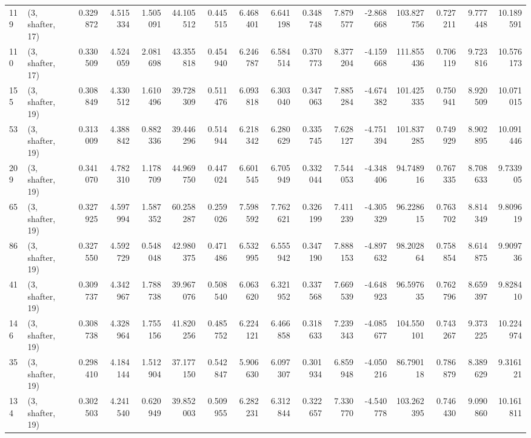 \begin{tabular}{llrrrrrrrrrrrrrr}
119 &  (3, shafter, 17) &   0.329872 &   4.515334 &  1.505091 &   44.105512 &  0.445515 &   6.468401 &   6.641198 &  0.348748 &   7.879577 &  -2.868668 &  103.827756 &  0.727211 &   9.777448 &  10.189591 \\
110 &  (3, shafter, 17) &   0.330509 &   4.524059 &  2.081698 &   43.355818 &  0.454940 &   6.246787 &   6.584514 &  0.370773 &   8.377204 &  -4.159668 &  111.855436 &  0.706119 &   9.723816 &  10.576173 \\
155 &  (3, shafter, 19) &   0.308849 &   4.330512 &  1.610496 &   39.728309 &  0.511476 &   6.093818 &   6.303040 &  0.347063 &   7.885284 &  -4.674382 &  101.425335 &  0.750941 &   8.920509 &  10.071015 \\
53  &  (3, shafter, 19) &   0.313009 &   4.388842 &  0.882336 &   39.446296 &  0.514944 &   6.218342 &   6.280629 &  0.335745 &   7.628127 &  -4.751394 &  101.837285 &  0.749929 &   8.902895 &  10.091446 \\
209 &  (3, shafter, 19) &   0.341070 &   4.782310 &  1.178709 &   44.969750 &  0.447024 &   6.601545 &   6.705949 &  0.332044 &   7.544053 &  -4.348406 &   94.748916 &  0.767335 &   8.708633 &   9.733905 \\
65  &  (3, shafter, 19) &   0.327925 &   4.597994 &  1.587352 &   60.258287 &  0.259026 &   7.598592 &   7.762621 &  0.326199 &   7.411239 &  -4.305329 &   96.228615 &  0.763702 &   8.814349 &   9.809619 \\
86  &  (3, shafter, 19) &   0.327550 &   4.592729 &  0.548048 &   42.980375 &  0.471486 &   6.532995 &   6.555942 &  0.347190 &   7.888153 &  -4.897632 &   98.202864 &  0.758854 &   8.614875 &   9.909736 \\
41  &  (3, shafter, 19) &   0.309737 &   4.342967 &  1.788738 &   39.967076 &  0.508540 &   6.063620 &   6.321952 &  0.337568 &   7.669539 &  -4.648923 &   96.597635 &  0.762796 &   8.659397 &   9.828410 \\
146 &  (3, shafter, 19) &   0.308738 &   4.328964 &  1.755156 &   41.820256 &  0.485752 &   6.224121 &   6.466858 &  0.318633 &   7.239343 &  -4.085677 &  104.550101 &  0.743267 &   9.373225 &  10.224974 \\
35  &  (3, shafter, 19) &   0.298410 &   4.184144 &  1.512904 &   37.177150 &  0.542847 &   5.906630 &   6.097307 &  0.301934 &   6.859948 &  -4.050216 &   86.790118 &  0.786879 &   8.389629 &   9.316121 \\
134 &  (3, shafter, 19) &   0.302503 &   4.241540 &  0.620949 &   39.852003 &  0.509955 &   6.282231 &   6.312844 &  0.322657 &   7.330770 &  -4.540778 &  103.262395 &  0.746430 &   9.090860 &  10.161811 \\

\end{tabular}
